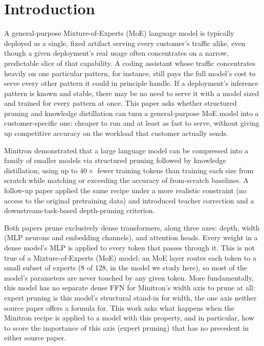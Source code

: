 \documentclass{article}
\theoremstyle{plain}
\theoremstyle{definition}
\theoremstyle{remark}
\begin{document}
\section{Introduction}
\label{sec:intro}

A general-purpose Mixture-of-Experts (MoE) language model is typically
deployed as a single, fixed artifact serving every customer's traffic
alike, even though a given deployment's real usage often concentrates on
a narrow, predictable slice of that capability. A coding assistant whose
traffic concentrates heavily on one particular pattern, for instance,
still pays the full model's cost to serve every other pattern it could
in principle handle. If a deployment's inference pattern is
known and stable, there may be no need to serve it with a model sized and
trained for every pattern at once. This paper asks whether structured
pruning and knowledge distillation can turn a general-purpose MoE model
into a customer-specific one: cheaper to run and at least as fast to
serve, without giving up competitive accuracy on the workload that
customer actually sends.

Minitron \cite{minitron2024} demonstrated that a large language model can be
compressed into a family of smaller models via structured pruning followed
by knowledge distillation, using up to $40\times$ fewer training tokens than
training each size from scratch while matching or exceeding the accuracy of
from-scratch baselines. A follow-up paper \cite{minitron2024practice} applied
the same recipe under a more realistic constraint (no access to the
original pretraining data) and introduced teacher correction and a
downstream-task-based depth-pruning criterion.

Both papers prune exclusively dense transformers, along three axes: depth,
width (MLP neurons and embedding channels), and attention heads. Every
weight in a dense model's MLP is applied to every token that passes through
it. This is not true of a Mixture-of-Experts (MoE) model: an MoE layer
routes each token to a small subset of experts (8 of 128, in the model we
study here), so most of the model's parameters are never touched by any
given token. More fundamentally, this model has no separate dense FFN for
Minitron's width axis to prune at all: expert pruning is this model's
structural stand-in for width, the one axis neither source paper offers a
formula for. This work asks what happens when the Minitron recipe is
applied to a model with this property, and in particular, how to score the
importance of this axis (expert pruning) that has no precedent in
either source paper.
\end{document}
